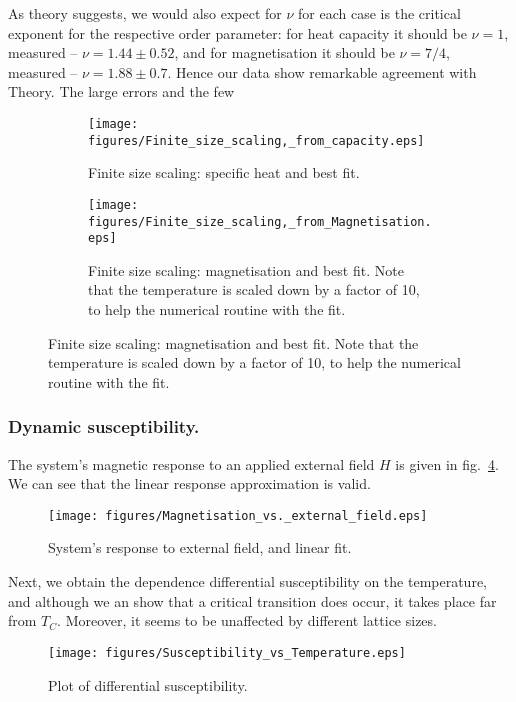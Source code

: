 \documentclass[12pt]{article}
\begin{document}
As theory suggests\cite{critExps}, we would also expect for \( \nu \) for each case is the critical exponent for the respective order parameter: for heat capacity it should be \( \nu =1\), measured -- \( \nu = 1.44 \pm 0.52\), and for magnetisation it should be \( \nu = 7/4\), measured -- \( \nu = 1.88 \pm 0.7\). Hence our data show remarkable agreement with Theory. The large errors and the few 

\begin{figure}[hp]
  \begin{subfigure}[t] {0.76\textwidth}
    \texttt{[image: figures/Finite\_size\_scaling,\_from\_capacity.eps]}
    \caption{Finite size scaling: specific heat and best fit. }\label{fig:finite_size_scaling_capacity}
  \end{subfigure}
  \begin{subfigure}[b] {0.76\textwidth}
    \texttt{[image: figures/Finite\_size\_scaling,\_from\_Magnetisation.eps]}
    \caption{Finite size scaling: magnetisation and best fit. Note that the temperature is scaled down by a factor of 10, to help the numerical routine with the fit. }\label{fig:finite_size_scaling_magnetisation}
  \end{subfigure}
\end{figure}




\subsubsection{Dynamic susceptibility.}

The system's magnetic response to an applied external field \(H\) is given in fig.~\ref{fig:m_vs_h}. We can see that the linear response approximation is valid. 

\begin{figure}[hp]
  \texttt{[image: figures/Magnetisation\_vs.\_external\_field.eps]}
  \caption{System's response to external field, and linear fit.}\label{fig:m_vs_h}
\end{figure}

Next, we obtain the dependence differential susceptibility on the temperature, and although we an show that a critical transition does occur, it takes place far from \(T_C\). Moreover, it seems to be unaffected by different lattice sizes.

\begin{figure}[hp]
  \texttt{[image: figures/Susceptibility\_vs\_Temperature.eps]}
  \caption{Plot of differential susceptibility. }\label{fig:differential_susceptibility}
\end{figure}
\end{document}

